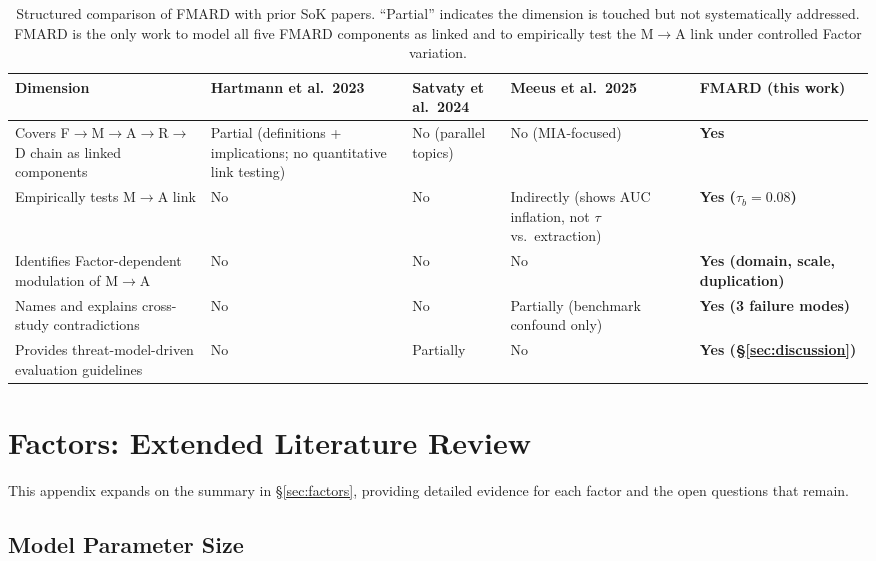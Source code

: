 \documentclass[11pt]{article}
\begin{document}
\begin{table}[t]
\centering
\footnotesize
\begin{tabular}{@{}p{3.8cm}p{2.2cm}p{2.2cm}p{2.4cm}p{2.6cm}@{}}
\toprule
\textbf{Dimension} & \textbf{Hartmann et al.\ 2023} & \textbf{Satvaty et al.\ 2024} & \textbf{Meeus et al.\ 2025} & \textbf{FMARD (this work)} \\
\midrule
Covers F$\to$M$\to$A$\to$R$\to$D chain as linked components
  & Partial (definitions + implications; no quantitative link testing)
  & No (parallel topics)
  & No (MIA-focused)
  & \textbf{Yes} \\
Empirically tests M$\to$A link
  & No
  & No
  & Indirectly (shows AUC inflation, not $\tau$ vs.\ extraction)
  & \textbf{Yes ($\tau_b = 0.08$)} \\
Identifies Factor-dependent modulation of M$\to$A
  & No
  & No
  & No
  & \textbf{Yes (domain, scale, duplication)} \\
Names and explains cross-study contradictions
  & No
  & No
  & Partially (benchmark confound only)
  & \textbf{Yes (3 failure modes)} \\
Provides threat-model-driven evaluation guidelines
  & No
  & Partially
  & No
  & \textbf{Yes (§\ref{sec:discussion})} \\
\bottomrule
\end{tabular}
\caption{Structured comparison of FMARD with prior SoK papers.
``Partial'' indicates the dimension is touched but not systematically addressed.
FMARD is the only work to model all five FMARD components as linked and to
empirically test the M$\to$A link under controlled Factor variation.}
\label{tab:sok-comparison}
\end{table}


\section{Factors: Extended Literature Review}
\label{app:factors}

This appendix expands on the summary in \S\ref{sec:factors}, providing
detailed evidence for each factor and the open questions that remain.

\subsection{Model Parameter Size}
\end{document}

